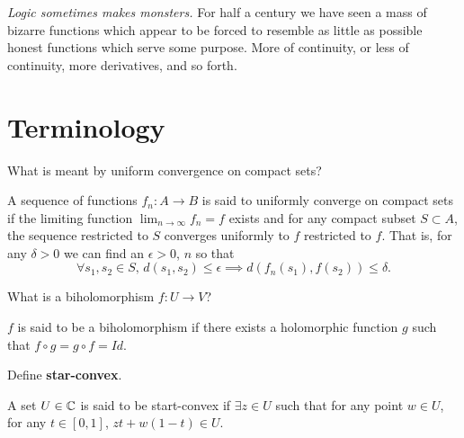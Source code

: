 \documentclass{homework}
\author{Alex Li}
\begin{document}
\maketitle

\begin{inspiration}
  \textit{Logic sometimes makes monsters.} For half a century we have
    seen a mass of bizarre functions which appear to be forced to
      resemble as little as possible honest functions which serve some
        purpose. More of continuity, or less of continuity, more
          derivatives, and so forth.
            \end{inspiration}

            \section{Terminology}

            \begin{problem}
              What is meant by uniform convergence on compact sets?
              \end{problem}
              \begin{solution}
              A sequence of functions $f_n:A \to B$ is said to uniformly converge on compact sets if the limiting function $\lim_{n\to\infty} f_n = f$ exists and for any compact subset $S\subset A$, the sequence restricted to $S$ converges uniformly to $f$ restricted to $f$. 
              That is, for any $\delta>0$ we can find an $\epsilon>0$, $n$ so that 
              \[\forall s_1, s_2\in S,\, d(s_1, s_2) \leq \epsilon \implies d(f_n(s_1), f(s_2)) \leq \delta.\]
              \end{solution}
              \begin{problem}
                What is a biholomorphism $f : U \to V$?
                \end{problem}
                \begin{solution}
                $f$ is said to be a biholomorphism if there exists a holomorphic function $g$ such that $f\circ g = g\circ f = Id$. 
                \end{solution}
                \begin{problem}
                  Define \textbf{star-convex}.
                  \end{problem}
                  \begin{solution}
                  A set $U\in \mathbb{C}$ is said to be start-convex if $\exists z \in U$ such that for any point $w \in U$, for any $t\in [0, 1]$, $zt + w(1-t) \in U$.
                  \end{solution}
\end{document}
